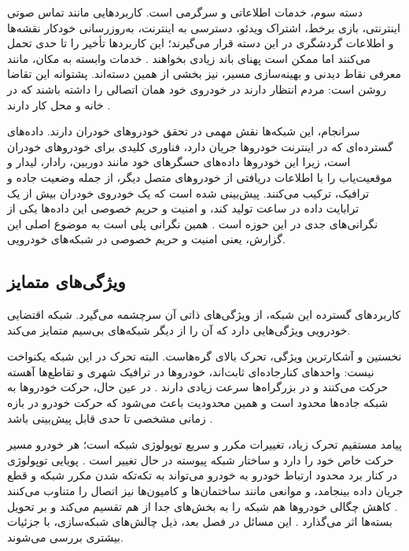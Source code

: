 دسته سوم، خدمات اطلاعاتی و سرگرمی است. کاربردهایی مانند تماس صوتی اینترنتی، بازی برخط، اشتراک ویدئو، دسترسی به اینترنت، به‌روزرسانی خودکار نقشه‌ها و اطلاعات گردشگری در این دسته قرار می‌گیرند؛ این کاربردها تأخیر را تا حدی تحمل می‌کنند اما ممکن است پهنای باند زیادی بخواهند \cite{hozouriOverviewVANETVehicular2023}. خدمات وابسته به مکان، مانند معرفی نقاط دیدنی و بهینه‌سازی مسیر، نیز بخشی از همین دسته‌اند. پشتوانه این تقاضا روشن است: مردم انتظار دارند در خودروی خود همان اتصالی را داشته باشند که در خانه و محل کار دارند \cite{luConnectedVehiclesSolutions2014}.

سرانجام، این شبکه‌ها نقش مهمی در تحقق خودروهای خودران دارند. داده‌های گسترده‌ای که در اینترنت خودروها جریان دارد، فناوری کلیدی برای خودروهای خودران است، زیرا این خودروها داده‌های حسگرهای خود مانند دوربین، رادار، لیدار و موقعیت‌یاب را با اطلاعات دریافتی از خودروهای متصل دیگر، از جمله وضعیت جاده و ترافیک، ترکیب می‌کنند. پیش‌بینی شده است که یک خودروی خودران بیش از یک ترابایت داده در ساعت تولید کند، و امنیت و حریم خصوصی این داده‌ها یکی از نگرانی‌های جدی در این حوزه است \cite{xuInternetVehiclesBig2018}. همین نگرانی پلی است به موضوع اصلی این گزارش، یعنی امنیت و حریم خصوصی در شبکه‌های خودرویی.

\subsection{ویژگی‌های متمایز}

کاربردهای گسترده این شبکه، از ویژگی‌های ذاتی آن سرچشمه می‌گیرد. شبکه اقتضایی خودرویی ویژگی‌هایی دارد که آن را از دیگر شبکه‌های بی‌سیم متمایز می‌کند.

نخستین و آشکارترین ویژگی، تحرک بالای گره‌هاست. البته تحرک در این شبکه یکنواخت نیست: واحدهای کنارجاده‌ای ثابت‌اند، خودروها در ترافیک شهری و تقاطع‌ها آهسته حرکت می‌کنند و در بزرگراه‌ها سرعت زیادی دارند \cite{hozouriOverviewVANETVehicular2023}. در عین حال، حرکت خودروها به شبکه جاده‌ها محدود است و همین محدودیت باعث می‌شود که حرکت خودرو در بازه زمانی مشخصی تا حدی قابل پیش‌بینی باشد \cite{hozouriOverviewVANETVehicular2023,luConnectedVehiclesSolutions2014}.

پیامد مستقیم تحرک زیاد، تغییرات مکرر و سریع توپولوژی شبکه است؛ هر خودرو مسیر حرکت خاص خود را دارد و ساختار شبکه پیوسته در حال تغییر است \cite{luConnectedVehiclesSolutions2014}. پویایی توپولوژی در کنار برد محدود ارتباط خودرو به خودرو می‌تواند به تکه‌تکه شدن مکرر شبکه و قطع جریان داده بینجامد، و موانعی مانند ساختمان‌ها و کامیون‌ها نیز اتصال را متناوب می‌کنند \cite{luConnectedVehiclesSolutions2014}. کاهش چگالی خودروها هم شبکه را به بخش‌های جدا از هم تقسیم می‌کند و بر تحویل بسته‌ها اثر می‌گذارد \cite{hozouriOverviewVANETVehicular2023}. این مسائل در فصل بعد، ذیل چالش‌های شبکه‌سازی، با جزئیات بیشتری بررسی می‌شوند.

